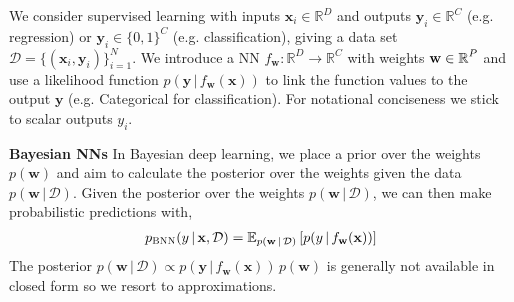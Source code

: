 \documentclass{article}
\newcommand{\dataset}{\ensuremath{\mathcal{D}}}
\newcommand{\inputDomain}{\ensuremath{\mathbb{R}^{D}}}
\newcommand{\outputDomain}{\ensuremath{\mathbb{R}^{C}}}
\newcommand{\weights}{\ensuremath{\mathbf{w}}}
\newcommand{\mbf}[1]{\mathbf{#1}}
\renewcommand{\mid}{\,|\,}
\newcommand{\vx}{\mbf{x}}
\newcommand{\vy}{\mbf{y}}
\newcommand{\vw}{\mbf{w}}
\begin{document}

We consider supervised learning with inputs $\vx_i \in \inputDomain$ and outputs $\vy_i \in \outputDomain$ (e.g. regression) or $\vy_{i} \in \{0,1\}^{C}$ (e.g. classification),
giving a data set $\dataset = \{(\vx_{i} , \vy_{i})\}_{i=1}^{N}$.
We introduce a  NN $f_\mathbf{w}: \inputDomain \to \outputDomain$ with weights $\weights \in \R^{P}$ and use a likelihood function $p(\vy \mid f_\mathbf{w}(\vx))$
to link the function values to the output $\vy$ (e.g. Categorical for classification).
For notational conciseness we stick to scalar outputs $y_{i}$.

\textbf{Bayesian NNs}
In Bayesian deep learning, we place a prior over the weights $p(\vw)$ and aim to calculate the posterior over the weights given the data $p(\vw \mid \mathcal{D})$.
Given the posterior over the weights $p(\vw \mid \mathcal{D})$, we can then make probabilistic predictions with,
\begin{align} \label{eq-predictions}
  p_{\text{\sc BNN}}(y \mid \vx, \mathcal{D}) = \E_{p(\vw \mid \mathcal{D})} \left[ p(y \mid f_{\vw}(\vx)) \right]
\end{align}
The posterior ${p(\vw \mid \dataset) \propto p(\vy \mid f_{\weights}(\vx)) \, p(\weights)}$ is generally not available in closed form
so we resort to approximations.
\end{document}
